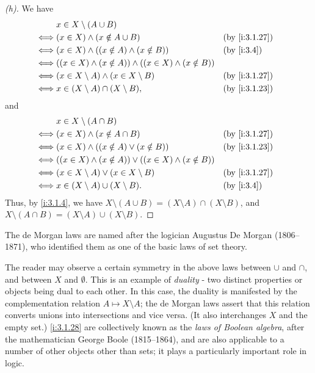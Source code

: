\begin{proof}[(h)]
  We have
  \begin{align*}
         & x \in X \setminus (A \cup B)                                                           \\
    \iff & (x \in X) \land (x \notin A \cup B)                                 &  & \by{i:3.1.27} \\
    \iff & (x \in X) \land ((x \notin A) \land (x \notin B))                   &  & \by{i:3.4}    \\
    \iff & ((x \in X) \land (x \notin A)) \land ((x \in X) \land (x \notin B))                    \\
    \iff & (x \in X \setminus A) \land (x \in X \setminus B)                   &  & \by{i:3.1.27} \\
    \iff & x \in (X \setminus A) \cap (X \setminus B),                         &  & \by{i:3.1.23}
  \end{align*}
  and
  \begin{align*}
         & x \in X \setminus (A \cap B)                                                          \\
    \iff & (x \in X) \land (x \notin A \cap B)                                &  & \by{i:3.1.27} \\
    \iff & (x \in X) \land ((x \notin A) \lor (x \notin B))                   &  & \by{i:3.1.23} \\
    \iff & ((x \in X) \land (x \notin A)) \lor ((x \in X) \land (x \notin B))                    \\
    \iff & (x \in X \setminus A) \lor (x \in X \setminus B)                   &  & \by{i:3.1.27} \\
    \iff & x \in (X \setminus A) \cup (X \setminus B).                        &  & \by{i:3.4}
  \end{align*}
  Thus, by \cref{i:3.1.4}, we have \(X \setminus (A \cup B) = (X \setminus A) \cap (X \setminus B)\), and \(X \setminus (A \cap B) = (X \setminus A) \cup (X \setminus B)\).
\end{proof}

\begin{rmk}\label{i:3.1.29}
  The de Morgan laws are named after the logician Augustus De Morgan (1806--1871), who identified them as one of the basic laws of set theory.
\end{rmk}

\begin{rmk}\label{i:3.1.30}
  The reader may observe a certain symmetry in the above laws between \(\cup\) and \(\cap\), and between \(X\) and \(\emptyset\).
  This is an example of \emph{duality} - two distinct properties or objects being dual to each other.
  In this case, the duality is manifested by the complementation relation \(A \mapsto X \setminus A\);
  the de Morgan laws assert that this relation converts unions into intersections and vice versa.
  (It also interchanges \(X\) and the empty set.)
  \cref{i:3.1.28} are collectively known as the \emph{laws of Boolean algebra}, after the mathematician George Boole (1815--1864), and are also applicable to a number of other objects other than sets;
  it plays a particularly important role in logic.
\end{rmk}

